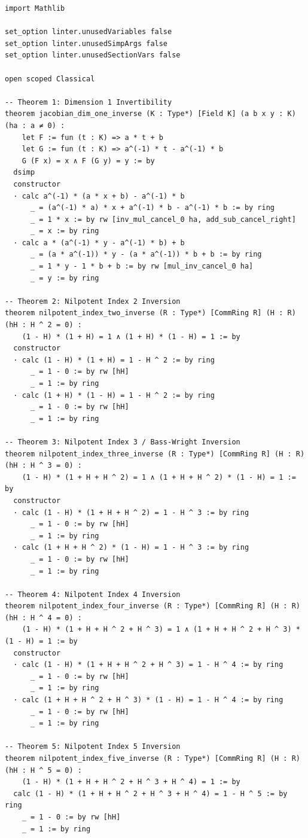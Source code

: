 \documentclass[11pt,a4paper]{article}
\theoremstyle{definition}
\begin{document}
\begin{lstlisting}[caption={Formal Lean 4 Verification of Jacobian Inversion Identities}]
import Mathlib

set_option linter.unusedVariables false
set_option linter.unusedSimpArgs false
set_option linter.unusedSectionVars false

open scoped Classical

-- Theorem 1: Dimension 1 Invertibility
theorem jacobian_dim_one_inverse (K : Type*) [Field K] (a b x y : K) (ha : a ≠ 0) :
    let F := fun (t : K) => a * t + b
    let G := fun (t : K) => a^(-1) * t - a^(-1) * b
    G (F x) = x ∧ F (G y) = y := by
  dsimp
  constructor
  · calc a^(-1) * (a * x + b) - a^(-1) * b
      _ = (a^(-1) * a) * x + a^(-1) * b - a^(-1) * b := by ring
      _ = 1 * x := by rw [inv_mul_cancel_0 ha, add_sub_cancel_right]
      _ = x := by ring
  · calc a * (a^(-1) * y - a^(-1) * b) + b
      _ = (a * a^(-1)) * y - (a * a^(-1)) * b + b := by ring
      _ = 1 * y - 1 * b + b := by rw [mul_inv_cancel_0 ha]
      _ = y := by ring

-- Theorem 2: Nilpotent Index 2 Inversion
theorem nilpotent_index_two_inverse (R : Type*) [CommRing R] (H : R) (hH : H ^ 2 = 0) :
    (1 - H) * (1 + H) = 1 ∧ (1 + H) * (1 - H) = 1 := by
  constructor
  · calc (1 - H) * (1 + H) = 1 - H ^ 2 := by ring
      _ = 1 - 0 := by rw [hH]
      _ = 1 := by ring
  · calc (1 + H) * (1 - H) = 1 - H ^ 2 := by ring
      _ = 1 - 0 := by rw [hH]
      _ = 1 := by ring

-- Theorem 3: Nilpotent Index 3 / Bass-Wright Inversion
theorem nilpotent_index_three_inverse (R : Type*) [CommRing R] (H : R) (hH : H ^ 3 = 0) :
    (1 - H) * (1 + H + H ^ 2) = 1 ∧ (1 + H + H ^ 2) * (1 - H) = 1 := by
  constructor
  · calc (1 - H) * (1 + H + H ^ 2) = 1 - H ^ 3 := by ring
      _ = 1 - 0 := by rw [hH]
      _ = 1 := by ring
  · calc (1 + H + H ^ 2) * (1 - H) = 1 - H ^ 3 := by ring
      _ = 1 - 0 := by rw [hH]
      _ = 1 := by ring

-- Theorem 4: Nilpotent Index 4 Inversion
theorem nilpotent_index_four_inverse (R : Type*) [CommRing R] (H : R) (hH : H ^ 4 = 0) :
    (1 - H) * (1 + H + H ^ 2 + H ^ 3) = 1 ∧ (1 + H + H ^ 2 + H ^ 3) * (1 - H) = 1 := by
  constructor
  · calc (1 - H) * (1 + H + H ^ 2 + H ^ 3) = 1 - H ^ 4 := by ring
      _ = 1 - 0 := by rw [hH]
      _ = 1 := by ring
  · calc (1 + H + H ^ 2 + H ^ 3) * (1 - H) = 1 - H ^ 4 := by ring
      _ = 1 - 0 := by rw [hH]
      _ = 1 := by ring

-- Theorem 5: Nilpotent Index 5 Inversion
theorem nilpotent_index_five_inverse (R : Type*) [CommRing R] (H : R) (hH : H ^ 5 = 0) :
    (1 - H) * (1 + H + H ^ 2 + H ^ 3 + H ^ 4) = 1 := by
  calc (1 - H) * (1 + H + H ^ 2 + H ^ 3 + H ^ 4) = 1 - H ^ 5 := by ring
    _ = 1 - 0 := by rw [hH]
    _ = 1 := by ring


\end{lstlisting}
\end{document}
